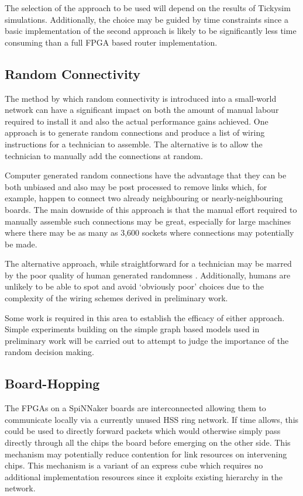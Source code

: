			The selection of the approach to be used will depend on the results of
			Tickysim simulations. Additionally, the choice may be guided by time
			constraints since a basic implementation of the second approach is likely
			to be significantly less time consuming than a full FPGA based router
			implementation.
		
		\subsection{Random Connectivity}
			
			The method by which random connectivity is introduced into a small-world
			network can have a significant impact on both the amount of manual labour
			required to install it and also the actual performance gains achieved. One
			approach is to generate random connections and produce a list of wiring
			instructions for a technician to assemble. The alternative is to allow the
			technician to manually add the connections at random.
			
			Computer generated random connections have the advantage that they can be
			both unbiased and also may be post processed to remove links which, for
			example, happen to connect two already neighbouring or nearly-neighbouring
			boards. The main downside of this approach is that the manual effort
			required to manually assemble such connections may be great, especially
			for large machines where there may be as many as 3,600 sockets where
			connections may potentially be made.
			
			The alternative approach, while straightforward for a technician may be
			marred by the poor quality of human generated randomness
			\cite{figurska08}. Additionally, humans are unlikely to be able to spot
			and avoid `obviously poor' choices due to the complexity of the wiring
			schemes derived in preliminary work.
			
			Some work is required in this area to establish the efficacy of either
			approach. Simple experiments building on the simple graph based models
			used in preliminary work will be carried out to attempt to judge the
			importance of the random decision making.
		
		\subsection{Board-Hopping}
			
			
			The FPGAs on a SpiNNaker boards are interconnected allowing them to
			communicate locally via a currently unused HSS ring network. If time
			allows, this could be used to directly forward packets which would
			otherwise simply pass directly through all the chips the board before
			emerging on the other side. This mechanism may potentially reduce
			contention for link resources on intervening chips. This mechanism is a
			variant of an express cube \cite{dally91} which requires no additional
			implementation resources since it exploits existing hierarchy in the
			network.
		
